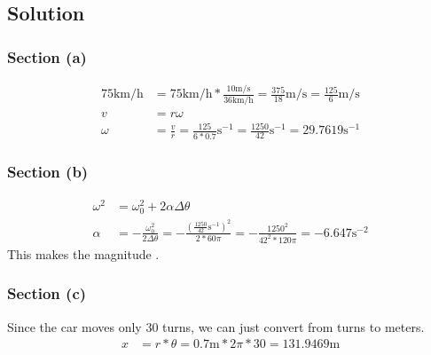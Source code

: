 \documentclass[12pt]{article}
\begin{document}
\subsection{Solution}
\subsubsection{Section (a)}
\begin{align}
    75\unit{\kilo\meter/\hour}  &=  75 \unit{\kilo\meter/\hour} * \frac{10\unit{\meter/\second}}{36\unit{\kilo\meter/\hour}}
        =   \frac{375}{18}\unit{\meter/\second}
        =   \frac{125}{6}\unit{\meter/\second}\\
    v   &=  r \omega\\
    \omega  &=  \frac{v}{r}
        =   \frac{125}{6*0.7}\unit{\second^{-1}}
        =   \frac{1250}{42}\unit{\second^{-1}}
        =   \boxed{29.7619\unit{\second^{-1}}}
\end{align}

\subsubsection{Section (b)}
\begin{align}
    \omega^2    &=  \omega_0^2  +   2\alpha \Delta\theta\\
    \alpha  &=  -\frac{\omega_0^2}{2\Delta\theta}
        =   -\frac{\left(\frac{1250}{42}\unit{\second^{-1}}\right)^2}{2*60\pi}
        =   -\frac{1250^2}{42^2*120\pi}
        =   -6.647 \unit{\second^{-2}}
\end{align}
This makes the magnitude .

\subsubsection{Section (c)}
Since the car moves only 30 turns, we can just convert from turns to meters.
\begin{align}
    x   &=  r*\theta
        =   0.7\unit{\meter}*2\pi*30
        =   \boxed{131.9469\unit{\meter}}
\end{align}


\pagebreak
\end{document}
